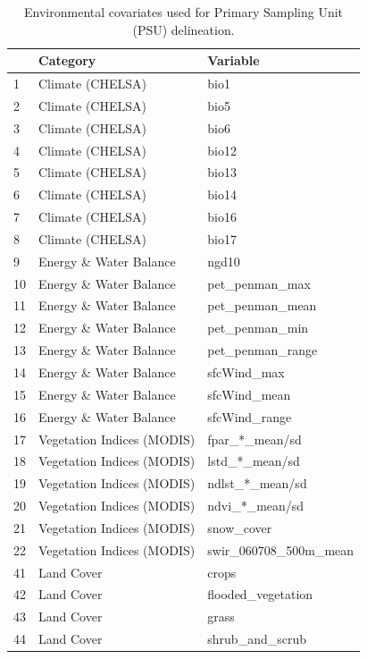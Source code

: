 \documentclass[
  10pt,
  b5paper,
  oneside]{book}
\begin{document}
\begin{table}

\caption{\label{tab:table-main-covs}Environmental covariates used for Primary Sampling Unit (PSU) delineation.}
\centering
\begin{tabular}[t]{l|l|l}
\hline
  & Category & Variable\\
\hline
1 & Climate (CHELSA) & bio1\\
\hline
2 & Climate (CHELSA) & bio5\\
\hline
3 & Climate (CHELSA) & bio6\\
\hline
4 & Climate (CHELSA) & bio12\\
\hline
5 & Climate (CHELSA) & bio13\\
\hline
6 & Climate (CHELSA) & bio14\\
\hline
7 & Climate (CHELSA) & bio16\\
\hline
8 & Climate (CHELSA) & bio17\\
\hline
9 & Energy \& Water Balance & ngd10\\
\hline
10 & Energy \& Water Balance & pet\_penman\_max\\
\hline
11 & Energy \& Water Balance & pet\_penman\_mean\\
\hline
12 & Energy \& Water Balance & pet\_penman\_min\\
\hline
13 & Energy \& Water Balance & pet\_penman\_range\\
\hline
14 & Energy \& Water Balance & sfcWind\_max\\
\hline
15 & Energy \& Water Balance & sfcWind\_mean\\
\hline
16 & Energy \& Water Balance & sfcWind\_range\\
\hline
17 & Vegetation Indices (MODIS) & fpar\_*\_mean/sd\\
\hline
18 & Vegetation Indices (MODIS) & lstd\_*\_mean/sd\\
\hline
19 & Vegetation Indices (MODIS) & ndlst\_*\_mean/sd\\
\hline
20 & Vegetation Indices (MODIS) & ndvi\_*\_mean/sd\\
\hline
21 & Vegetation Indices (MODIS) & snow\_cover\\
\hline
22 & Vegetation Indices (MODIS) & swir\_060708\_500m\_mean\\
\hline
41 & Land Cover & crops\\
\hline
42 & Land Cover & flooded\_vegetation\\
\hline
43 & Land Cover & grass\\
\hline
44 & Land Cover & shrub\_and\_scrub\\

\end{tabular}
\end{table}
\end{document}
